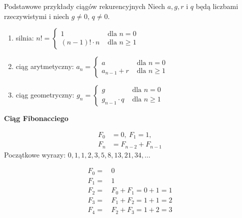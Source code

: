 \documentclass[a4paper,10pt]{beamer}
\begin{document}
\begin{frame}
	
	\begin{exampleblock}{Podstawowe przykłady ciągów rekurencyjnych}
		Niech $a,g,r$ i $q$ będą liczbami rzeczywistymi i niech $g\neq0$, $q\neq0$.
		\begin{enumerate}
			\item silnia: $\displaystyle n!=\left\{\begin{array}{ll}1&\mbox{ dla }n=0\\(n-1)!\cdot n&\mbox{ dla }n\geq1\end{array}\right.$
			\item ciąg arytmetyczny: $\displaystyle a_n=\left\{\begin{array}{ll}a&\mbox{ dla }n=0\\a_{n-1}+r&\mbox{ dla }n\geq1\end{array}\right.$
			\item ciąg geometryczny: $\displaystyle g_n=\left\{\begin{array}{ll}g&\mbox{ dla }n=0\\g_{n-1}\cdot q&\mbox{ dla }n\geq1\end{array}\right.$
		\end{enumerate}
	\end{exampleblock}
	
\end{frame}


\begin{frame}

{\bf Ciąg Fibonacciego}
		
		\begin{align*}
			F_0&=0,\ F_1=1,\\
			F_n&=F_{n-2}+F_{n-1}
		\end{align*}
		Początkowe wyrazy: $0,1,1,2,3,5,8,13,21,34,\ldots$
		
\begin{align*}
F_0=&\,0\\
F_1=&\,1\\
F_2=&\,F_0+F_1=0+1=1\\
F_3=&\,F_1+F_2=1+1=2\\
F_4=&\,F_2+F_3=1+2=3
\end{align*}

\end{frame}
\end{document}
